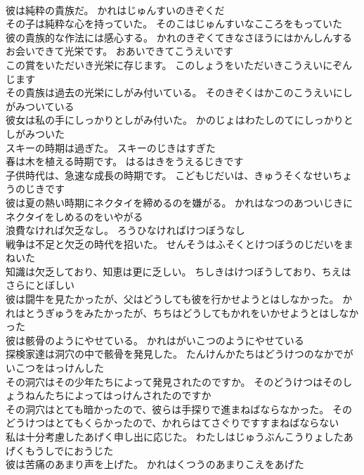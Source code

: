 \documentclass[8pt]{extreport}
\begin{document}
\begin{CJK}{UTF8}{min}
\\	彼は純粋の貴族だ。	かれはじゅんすいのきぞくだ 
\\	その子は純粋な心を持っていた。	そのこはじゅんすいなこころをもっていた 
\\	彼の貴族的な作法には感心する。	かれのきぞくてきなさほうにはかんしんする 
\\	お会いできて光栄です。	おあいできてこうえいです 
\\	この賞をいただいき光栄に存じます。	このしょうをいただいきこうえいにぞんじます 
\\	その貴族は過去の光栄にしがみ付いている。	そのきぞくはかこのこうえいにしがみついている 
\\	彼女は私の手にしっかりとしがみ付いた。	かのじょはわたしのてにしっかりとしがみついた 
\\	スキーの時期は過ぎた。	スキーのじきはすぎた 
\\	春は木を植える時期です。	はるはきをうえるじきです 
\\	子供時代は、急速な成長の時期です。	こどもじだいは、きゅうそくなせいちょうのじきです 
\\	彼は夏の熱い時期にネクタイを締めるのを嫌がる。	かれはなつのあついじきにネクタイをしめるのをいやがる 
\\	浪費なければ欠乏なし。	ろうひなければけつぼうなし 
\\	戦争は不足と欠乏の時代を招いた。	せんそうはふそくとけつぼうのじだいをまねいた 
\\	知識は欠乏しており、知恵は更に乏しい。	ちしきはけつぼうしており、ちえはさらにとぼしい 
\\	彼は闘牛を見たかったが、父はどうしても彼を行かせようとはしなかった。	かれはとうぎゅうをみたかったが、ちちはどうしてもかれをいかせようとはしなかった 
\\	彼は骸骨のようにやせている。	かれはがいこつのようにやせている 
\\	探検家達は洞穴の中で骸骨を発見した。	たんけんかたちはどうけつのなかでがいこつをはっけんした 
\\	その洞穴はその少年たちによって発見されたのですか。	そのどうけつはそのしょうねんたちによってはっけんされたのですか 
\\	その洞穴はとても暗かったので、彼らは手探りで進まねばならなかった。	そのどうけつはとてもくらかったので、かれらはてさぐりですすまねばならない 
\\	私は十分考慮したあげく申し出に応じた。	わたしはじゅうぶんこうりょしたあげくもうしでにおうじた 
\\	彼は苦痛のあまり声を上げた。	かれはくつうのあまりこえをあげた 

\end{CJK}
\end{document}
